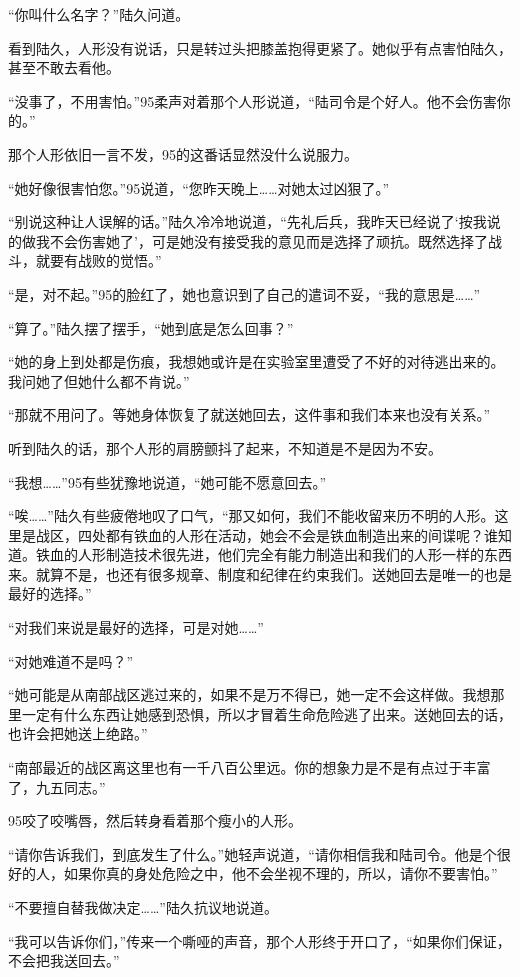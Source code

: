 “你叫什么名字？”陆久问道。

看到陆久，人形没有说话，只是转过头把膝盖抱得更紧了。她似乎有点害怕陆久，甚至不敢去看他。

“没事了，不用害怕。”95柔声对着那个人形说道，“陆司令是个好人。他不会伤害你的。”

那个人形依旧一言不发，95的这番话显然没什么说服力。

“她好像很害怕您。”95说道，“您昨天晚上……对她太过凶狠了。”

“别说这种让人误解的话。”陆久冷冷地说道，“先礼后兵，我昨天已经说了‘按我说的做我不会伤害她了’，可是她没有接受我的意见而是选择了顽抗。既然选择了战斗，就要有战败的觉悟。”

“是，对不起。”95的脸红了，她也意识到了自己的遣词不妥，“我的意思是……”

“算了。”陆久摆了摆手，“她到底是怎么回事？”

“她的身上到处都是伤痕，我想她或许是在实验室里遭受了不好的对待逃出来的。我问她了但她什么都不肯说。”

“那就不用问了。等她身体恢复了就送她回去，这件事和我们本来也没有关系。”

听到陆久的话，那个人形的肩膀颤抖了起来，不知道是不是因为不安。

“我想……”95有些犹豫地说道，“她可能不愿意回去。”

“唉……”陆久有些疲倦地叹了口气，“那又如何，我们不能收留来历不明的人形。这里是战区，四处都有铁血的人形在活动，她会不会是铁血制造出来的间谍呢？谁知道。铁血的人形制造技术很先进，他们完全有能力制造出和我们的人形一样的东西来。就算不是，也还有很多规章、制度和纪律在约束我们。送她回去是唯一的也是最好的选择。”

“对我们来说是最好的选择，可是对她……”

“对她难道不是吗？”

“她可能是从南部战区逃过来的，如果不是万不得已，她一定不会这样做。我想那里一定有什么东西让她感到恐惧，所以才冒着生命危险逃了出来。送她回去的话，也许会把她送上绝路。”

“南部最近的战区离这里也有一千八百公里远。你的想象力是不是有点过于丰富了，九五同志。”

95咬了咬嘴唇，然后转身看着那个瘦小的人形。

“请你告诉我们，到底发生了什么。”她轻声说道，“请你相信我和陆司令。他是个很好的人，如果你真的身处危险之中，他不会坐视不理的，所以，请你不要害怕。”

“不要擅自替我做决定……”陆久抗议地说道。

“我可以告诉你们，”传来一个嘶哑的声音，那个人形终于开口了，“如果你们保证，不会把我送回去。”

